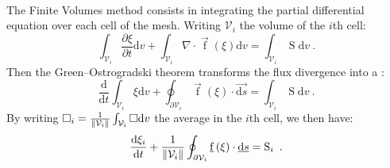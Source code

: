       \paragraph{}
      The Finite Volumes method consists in integrating the partial differential equation over each cell of the mesh.
      Writing $\mathcal{V}_i$ the volume of the $i$th cell:
      \begin{equation}
        \int_{\mathcal{V}_i} \frac{\partial \xi}{\partial t} \mathrm{d}v + \int_{\mathcal{V}_i} \nabla\cdot \vec{\operatorname{f}}\left(\xi\right) \mathrm{d}v = \int_{\mathcal{V}_i} \operatorname{S} \mathrm{d}v\ .
      \end{equation}
      Then the Green--Ostrogradski theorem transforms the flux divergence into a :
      \begin{equation}
        \frac{\mathrm{d}}{\mathrm{d} t} \int_{\mathcal{V}_i} \xi\mathrm{d}v + \oint_{\partial\mathcal{V}_i} \vec{\operatorname{f}}\left(\xi\right) \cdot \vec{\mathrm{d}s} = \int_{\mathcal{V}_i} \operatorname{S} \mathrm{d}v\ .
      \end{equation}
      By writing $\square_i = \frac{1}{\norm{\mathcal{V}_i}} \int_{\mathcal{V}_i} \square \mathrm{d}v$ the average in the $i$th cell, we then have:
      \begin{equation}
        \frac{\mathrm{d}\xi_i}{\mathrm{d} t}  + \frac{1}{\norm{\mathcal{V}_i}} \oint_{\partial\mathcal{V}_i} \vec{\operatorname{f}}\left(\xi\right) \cdot \vec{\mathrm{d}s} = \operatorname{S}_i \ .
      \end{equation}


